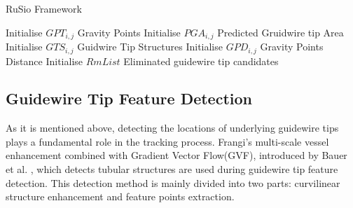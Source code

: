 \documentclass[journal]{IEEEtran}
\begin{document}
\begin{algorithm*}[bt]
\setlength{\abovedisplayskip}{3pt}
\setlength{\belowdisplayskip}{-3pt}
	\caption{RuSio Framework}
		Initialise $GPT_{i,j}$ Gravity Points\; 
		Initialise $PGA_{i,j}$ Predicted Gruidwire tip Area\; 
		Initialise $GTS_{i,j}$ Guidwire Tip Structures\; 
		Initialise $GPD_{i,j}$ Gravity Points Distance\; 
		Initialise $RmList$ Eliminated guidewire tip candidates\; 
\end{algorithm*}


\subsection{Guidewire Tip Feature Detection}
As it is mentioned above, detecting the locations of underlying guidewire tips plays a fundamental role in the tracking process. Frangi's multi-scale vessel enhancement\cite{frangi1998multiscale} combined with Gradient Vector Flow(GVF), introduced by Bauer et al. \cite{bauer2008novel}, which detects tubular structures are used during guidewire tip feature detection. This detection method is mainly divided into two parts: curvilinear structure enhancement and feature points extraction.
\end{document}
